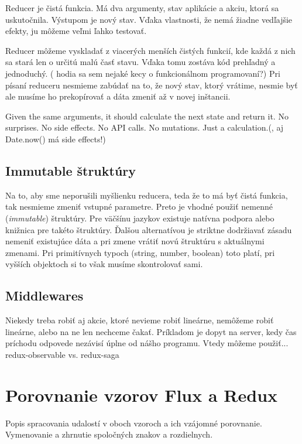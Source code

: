 Reducer je čistá funkcia. Má dva argumenty, stav aplikácie a akciu, ktorá sa uskutočnila. Výstupom je nový stav. Vďaka vlastnosti, že nemá žiadne vedľajšie efekty, ju môžeme veľmi ľahko testovať.

Reducer môžeme vyskladať z viacerých menších čistých funkcií, kde každá z nich sa stará len o určitú malú časť stavu. Vďaka tomu zostáva kód prehľadný a jednoduchý. 
(\TODO{} hodia sa sem nejaké kecy o funkcionálnom programovaní?)
Pri písaní reduceru nesmieme zabúdať na to, že nový stav, ktorý vrátime, nesmie byť  ale musíme ho prekopírovať a dáta zmeniť až v novej inštancii.

Given the same arguments, it should calculate the next state and return it. No surprises. No side effects. No API calls. No mutations. Just a calculation.(\TODO{}, aj Date.now() má side effects!)

\subsection{Immutable štruktúry}
Na to, aby sme neporušili myšlienku reducera, teda že to má byť čistá funkcia, tak nesmieme zmeniť vstupné parametre. Preto je vhodné použiť nemenné (\emph{immutable}) štruktúry. Pre väčšínu jazykov existuje natívna podpora alebo knižnica pre takéto štruktúry. Ďalšou alternatívou je striktne dodržiavať zásadu nemeniť existujúce dáta a pri zmene vrátiť novú štruktúru s aktuálnymi zmenami. Pri primitívnych typoch (string, number, boolean) toto platí, pri vyšších objektoch si to však musíme skontrolovať sami.

\subsection{Middlewares}
Niekedy treba robiť aj akcie, ktoré nevieme robiť lineárne, nemôžeme robiť lineárne, alebo na ne len nechceme čakať. Príkladom je dopyt na server, kedy čas príchodu odpovede nezávisí úplne od nášho programu. Vtedy môžeme použiť...%
\TODO
redux-observable vs. redux-saga





\section{Porovnanie vzorov Flux a Redux}
Popis spracovania udalostí v oboch vzoroch a ich vzájomné porovnanie. Vymenovanie a zhrnutie spoločných znakov a rozdielnych.

